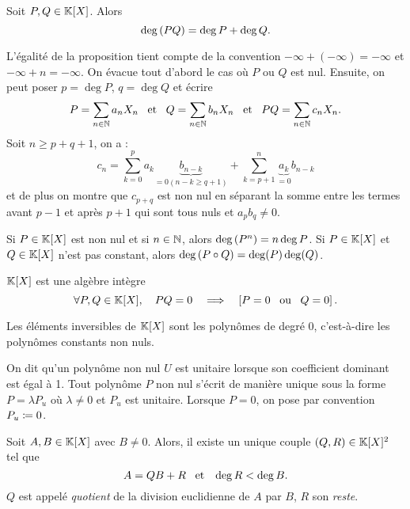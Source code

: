 \documentclass{magnolia}
\begin{document}
\begin{proposition}
Soit $P,Q\in\polyK$. Alors
\[\deg\left(PQ\right)=\deg P+\deg Q.\]
\end{proposition}

\begin{preuve}
L'égalité de la proposition tient compte de la convention $-\infty+(-\infty)=-\infty$ et $-\infty+n=-\infty$.
On évacue tout d'abord le cas où $P$ ou $Q$ est nul.
Ensuite, on peut poser $p=\deg P$, $q=\deg Q$ et écrire $$P=\sum_{n\in \mathbb{N}}a_nX_n \quad\!\text{et}\quad\!  Q=\sum_{n\in \mathbb{N}}b_nX_n \quad\!\text{et}\quad\! PQ=\sum_{n\in \mathbb{N}}c_nX_n.$$
Soit $n\geq p+q+1$, on a :
$$c_n=\sum_{k=0}^pa_k\underbrace{b_{n-k}}_{=0 (n-k\geq q+1)}+\sum_{k=p+1}^n\underbrace{a_k}_{=0}b_{n-k}$$
et de plus on montre que $c_{p+q}$ est non nul en séparant la somme entre les termes avant $p-1$ et après $p+1$ qui sont tous nuls et $a_pb_q\neq 0$.
\end{preuve}

\begin{remarques}
\remarque Si $P\in\polyK$ est non nul et si $n\in\mathbb{N}$, alors $\deg\left(P^n\right)=n\deg P$.
\remarque Si $P\in\polyK$ et $Q\in\polyK$ n'est pas constant,
  alors $\deg\left(P\circ Q\right)=\deg(P)\deg(Q)$.
\end{remarques}

\begin{proposition}
$\polyK$ est une algèbre intègre
\[\forall P,Q\in\polyK \qsep PQ=0 \quad\implique\quad \cro{P=0 \ou Q=0}.\]
\end{proposition}

\begin{proposition}
Les éléments inversibles de $\polyK$ sont les polynômes de degré 0, c'est-à-dire
les polynômes constants non nuls.
\end{proposition}

\begin{definition}
On dit qu'un polynôme non nul $U$ est unitaire lorsque son coefficient dominant est
égal à 1. Tout polynôme $P$ non nul s'écrit de manière unique sous la forme
$P=\lambda P_u$ où $\lambda\neq 0$ et $P_u$ est unitaire. Lorsque $P=0$, on pose
par convention $P_u\coloneqq 0$.
\end{definition}


\begin{definition}
  Soit $A,B\in\polyK$ avec $B\neq 0$. Alors, il existe un unique couple
  $\p{Q,R}\in\polyK^2$ tel que
  \[A=QB+R \quad\!\text{et}\quad\! \deg R<\deg B.\]
  $Q$ est appelé \emph{quotient} de la division euclidienne de $A$ par $B$, $R$ son
  \emph{reste}.
  \end{definition}
  
\end{document}
